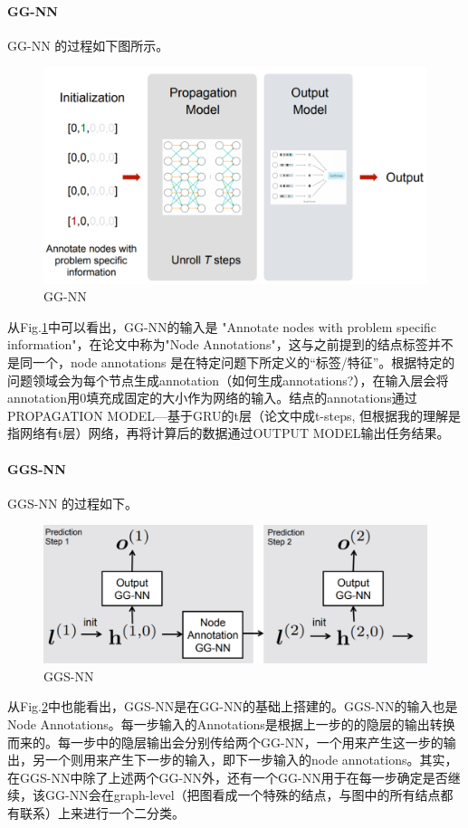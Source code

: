 \paragraph{GG-NN} GG-NN 的过程如下图所示。
\begin{figure}[h]
    \centering
    \includegraphics[width=.66\textwidth]{pics/ggnn.png}
    \caption{GG-NN}
    \label{fig:gg-nn}
\end{figure}
从Fig.\ref{fig:gg-nn}中可以看出，GG-NN的输入是 "Annotate nodes with problem specific information"，在论文中称为"Node Annotations"，这与之前提到的结点标签并不是同一个，node annotations 是在特定问题下所定义的“标签/特征”。根据特定的问题领域会为每个节点生成annotation（{\color{red}如何生成annotations?}），在输入层会将annotation用0填充成固定的大小作为网络的输入。结点的annotations通过PROPAGATION MODEL---基于GRU的t层（{\color{red}论文中成t-steps, 但根据我的理解是指网络有t层}）网络，再将计算后的数据通过OUTPUT MODEL输出任务结果。

\paragraph{GGS-NN} GGS-NN 的过程如下。
\begin{figure}[h]
    \centering
    \includegraphics[width=.6\textwidth]{pics/GGS-NN.png}
    \caption{GGS-NN}
    \label{fig:ggs-nn}
\end{figure}
从Fig.\ref{fig:ggs-nn}中也能看出，GGS-NN是在GG-NN的基础上搭建的。GGS-NN的输入也是Node Annotations。每一步输入的Annotations是根据上一步的的隐层的输出转换而来的。每一步中的隐层输出会分别传给两个GG-NN，一个用来产生这一步的输出，另一个则用来产生下一步的输入，即下一步输入的node annotations。其实，在GGS-NN中除了上述两个GG-NN外，还有一个GG-NN用于在每一步确定是否继续，该GG-NN会在graph-level（把图看成一个特殊的结点，与图中的所有结点都有联系）上来进行一个二分类。

